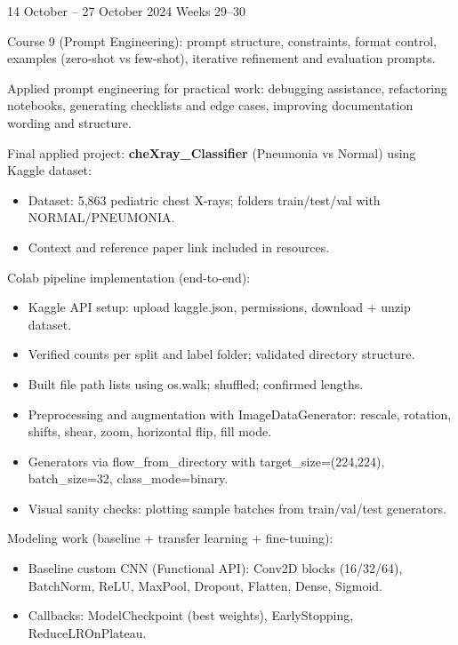 \documentclass[12pt,a4paper]{article}
\newcommand{\WeekEntry}[8]{
\begin{tcolorbox}[
  colback=boxgray,
  colframe=linegray,
  boxrule=0.6pt,
  arc=1.5mm,
  left=1mm,right=1mm,top=2mm,bottom=2mm
]
\noindent
\begin{tabularx}{\linewidth}{|p{2.8cm}|Y|}
\hline
\multicolumn{2}{|l|}{\textbf{Student's Logbook}}\\ \hline
\textbf{Date:} & #1 \\ \hline
\multicolumn{2}{|c|}{\textbf{#2}}\\ \hline
\textbf{Activities:} &
\begin{itemize}[leftmargin=1em,nosep,topsep=0pt,itemsep=1pt]
#3
\end{itemize}
\\ \hline
\textbf{Summary:} & #4 \\ \hline
\textbf{Key Topics:} &
\begin{itemize}[leftmargin=1em,nosep,topsep=0pt,itemsep=1pt]
#5
\end{itemize}
\\ \hline
\multicolumn{2}{|p{\dimexpr\linewidth-2\tabcolsep-2\arrayrulewidth}|}{\textbf{Achievement of the Day:} #6}\\ \hline
\textbf{Functional Skills:} &
\begin{itemize}[leftmargin=1em,nosep,topsep=0pt,itemsep=2pt]
#7
\end{itemize}
\\ \hline
\textbf{Soft Skills:} &
\begin{itemize}[leftmargin=1em,nosep,topsep=0pt,itemsep=2pt]
#8
\end{itemize}
\\ \hline
\end{tabularx}
\end{tcolorbox}
}
\begin{document}
\WeekEntry
{14 October -- 27 October 2024}
{Weeks 29--30}
{
\item Course 9 (Prompt Engineering): prompt structure, constraints, format control, examples (zero-shot vs few-shot), iterative refinement and evaluation prompts.
\item Applied prompt engineering for practical work: debugging assistance, refactoring notebooks, generating checklists and edge cases, improving documentation wording and structure.
\item Final applied project: \textbf{cheXray\_Classifier} (Pneumonia vs Normal) using Kaggle dataset:
  \begin{itemize}[leftmargin=*,nosep]
    \item Dataset: 5,863 pediatric chest X-rays; folders train/test/val with NORMAL/PNEUMONIA.
    \item Context and reference paper link included in resources.
  \end{itemize}
\item Colab pipeline implementation (end-to-end):
  \begin{itemize}[leftmargin=*,nosep]
    \item Kaggle API setup: upload kaggle.json, permissions, download + unzip dataset.
    \item Verified counts per split and label folder; validated directory structure.
    \item Built file path lists using os.walk; shuffled; confirmed lengths.
    \item Preprocessing and augmentation with ImageDataGenerator:
      rescale, rotation, shifts, shear, zoom, horizontal flip, fill mode.
    \item Generators via flow\_from\_directory with target\_size=(224,224), batch\_size=32, class\_mode=binary.
    \item Visual sanity checks: plotting sample batches from train/val/test generators.
  \end{itemize}
\item Modeling work (baseline + transfer learning + fine-tuning):
  \begin{itemize}[leftmargin=*,nosep]
    \item Baseline custom CNN (Functional API): Conv2D blocks (16/32/64), BatchNorm, ReLU, MaxPool, Dropout, Flatten, Dense, Sigmoid.
    \item Callbacks: ModelCheckpoint (best weights), EarlyStopping, ReduceLROnPlateau.

\end{itemize}}
\end{document}
